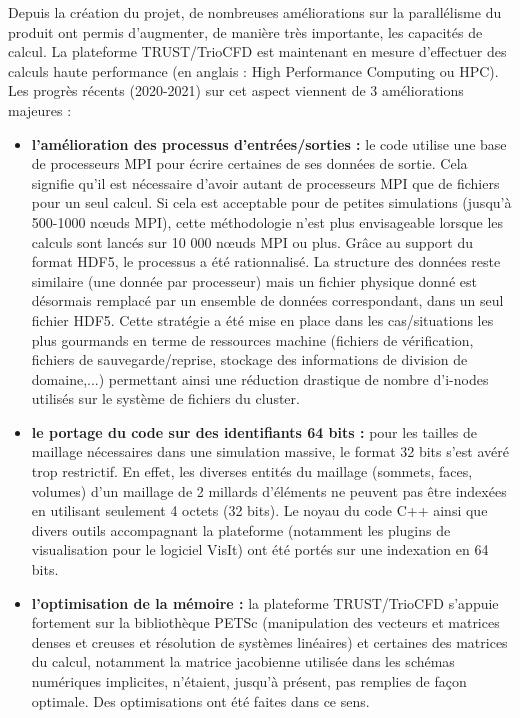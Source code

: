 Depuis la cr\'eation du projet, de nombreuses améliorations sur la parallélisme du produit ont permis d'augmenter, de manière très importante, les capacités de calcul. La plateforme TRUST/TrioCFD est maintenant en mesure d'effectuer des calculs haute performance (en anglais : High Performance Computing ou HPC). Les progrès récents (2020-2021) sur cet aspect viennent de 3 améliorations majeures :
\begin{itemize}
	\item \textbf{l'am\'elioration des processus d'entr\'ees/sorties :} le code utilise une base de	processeurs MPI pour \'ecrire certaines de ses donn\'ees de sortie. Cela signifie qu'il est n\'ecessaire d'avoir autant de processeurs MPI que de fichiers pour un seul calcul. Si cela est acceptable pour de petites simulations (jusqu'\`a 500-1000 n\oe{}uds MPI), cette m\'ethodologie n'est plus envisageable lorsque les calculs sont lanc\'es sur 10 000 n\oe{}uds MPI ou plus. Gr\^ace au support du format HDF5, le processus a 	\'et\'e rationnalis\'e. La structure des donn\'ees reste similaire (une donn\'ee par processeur) mais un fichier physique donn\'e est d\'esormais remplac\'e par un ensemble de donn\'ees correspondant, dans un seul 	fichier HDF5. Cette strat\'egie a \'et\'e mise en place dans les cas/situations les plus gourmands en terme de ressources machine (fichiers de v\'erification, fichiers de sauvegarde/reprise, stockage des informations de 	division de domaine,...) permettant ainsi une r\'eduction drastique de nombre d'i-nodes utilis\'es sur le système de fichiers du cluster.
	\item \textbf{le portage du code sur des identifiants 64 bits :} pour les tailles de maillage n\'ecessaires dans une simulation massive, le format 32 bits s'est av\'er\'e trop restrictif. En effet, les diverses entit\'es du maillage (sommets, faces, volumes) d'un maillage de 2 millards d'\'el\'ements ne peuvent pas \^etre index\'ees en utilisant seulement 4 octets (32 bits). Le noyau du code C++ ainsi que divers outils 	accompagnant la plateforme (notamment les plugins de visualisation pour le logiciel VisIt) ont \'et\'e port\'es sur une indexation en 64 bits.
	\item \textbf{l'optimisation de la m\'emoire :} la plateforme TRUST/TrioCFD s'appuie fortement sur la biblioth\`eque PETSc (manipulation des vecteurs et matrices denses et creuses et r\'esolution de syst\`emes lin\'eaires) et certaines des matrices du calcul, notamment la matrice jacobienne utilis\'ee dans les sch\'emas num\'eriques implicites, n'\'etaient, jusqu'\`a pr\'esent, pas remplies de fa\c con optimale. Des optimisations ont \'et\'e faites dans ce sens.
\end{itemize}

